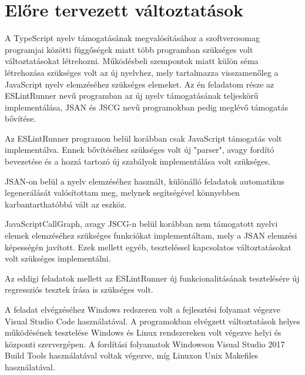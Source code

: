 \chapter{Előre tervezett változtatások}
\label{chap:fejezet3}


A TypeScript nyelv támogatásának megvalósításához a szoftvercsomag programjai közötti függőségek miatt több programban szükséges volt változtatásokat létrehozni.
Működésbeli szempontok miatt külön séma létrehozása szükséges volt az új nyelvhez, mely tartalmazza visszamenőleg a JavaScript nyelv elemzéséhez szükséges elemeket.
Az én feladatom része az ESLintRunner nevű programban az új nyelv támogatásának teljeskörű implementálása, JSAN és JSCG nevű programokban pedig meglévő támogatás bővítése.

Az ESLintRunner programon belül korábban csak JavaScript támogatás volt implementálva. Ennek bővítéséhez szükséges volt új "parser", avagy fordító bevezetése és a hozzá tartozó új szabályok implementálása volt szükséges.

JSAN-on belül a nyelv elemzéséhez használt, különálló feladatok automatikus legenerálását valósítottam meg, melynek segítségével könnyebben karbantarthatóbbá vált az eszköz.

JavaScriptCallGraph, avagy JSCG-n belül korábban nem támogatott nyelvi elemek elemzéséhez szükséges funkciókat implementáltam, mely a JSAN elemzési képességén javított.
Ezek mellett egyéb, teszteléssel kapcsolatos változtatásokat volt szükséges implementálni.

Az eddigi feladatok mellett az ESLintRunner új funkcionalitásának tesztelésére új regressziós tesztek írása is szükséges volt.

A feladat elvégzéséhez Windows redszeren volt a fejlesztési folyamat végezve Visual Studio Code használatával. A programokban elvégzett változtatások helyes működésének tesztelése Windows és Linux rendszereken volt végezve helyi és központi szervergépen. A fordítási folyamatok Windowson Visual Studio 2017 Build Tools használatával voltak végezve, míg Linuxon Unix Makefiles használatával.